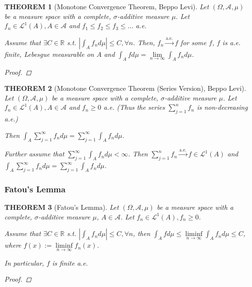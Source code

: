 \documentclass[12pt]{article}
\theoremstyle{blueplain}
\newtheorem{theorem}{THEOREM}[section]
\theoremstyle{bluedef}
\theoremstyle{blueremark}
\newcommand{\R}{\mathbb{R}}
\numberwithin{equation}{section}
\begin{document}
\begin{theorem}[Monotone Convergence Theorem, Beppo Levi]

  Let $(\Omega, \mathcal{A}, \mu)$ be a measure space with a complete, $\sigma$-additive measure $\mu$. Let $f_n \in \mathcal{L}^1(A), A \in \mathcal{A}$ and $f_1 \leq f_2 \leq f_3 \leq \ldots$ a.e.

  Assume that $\exists C \in \R$ s.t. $|\int_A f_n d\mu| \leq C, \forall n$. Then, $f_n \overset{\text{a.e.}}{\rightarrow} f$ for some $f$, $f$ is a.e. finite, Lebesgue measurable on $A$ and $\int_A f d\mu = \lim\limits_{n \to \infty} \int_A f_n d\mu$.

  \begin{proof}




  \end{proof}
\end{theorem}

\begin{theorem}[Monotone Convergence Theorem (Series Version), Beppo Levi]

  Let $(\Omega, \mathcal{A}, \mu)$ be a measure space with a complete, $\sigma$-additive measure $\mu$. Let $f_n \in \mathcal{L}^1(A), A \in \mathcal{A}$ and $f_n \geq 0$ a.e. (Thus  the series $\sum_{j=1}^n f_n$ is non-decreasing a.e.)

  Then $\int_A \sum_{j=1}^\infty f_n d\mu = \sum_{j=1}^\infty \int_A f_n d\mu$.

  Further assume that $\sum_{j=1}^\infty \int_A f_n d\mu < \infty$. Then $\sum_{j=1}^n f_n \overset{\text{a.e.}}{\rightarrow} f \in \mathcal{L}^1(A)$ and $\int_A \sum_{j=1}^\infty f_n d\mu = \sum_{j=1}^\infty \int_A f_n d\mu$.
\end{theorem}

\subsubsection{Fatou's Lemma}

\begin{theorem}[Fatou's Lemma]

  Let $(\Omega, \mathcal{A}, \mu)$ be a measure space with a complete, $\sigma$-additive measure $\mu$, $A \in \mathcal{A}$. Let $f_n \in \mathcal{L}^1(A), f_n \geq 0$.

  Assume that $\exists C \in \R$ s.t. $|\int_A f_n d\mu| \leq C, \forall n$, then $\int_A f d\mu \leq \liminf\limits_{n \to \infty} \int_A f_n d\mu \leq C$, where $f(x) := \liminf\limits_{n \to \infty} f_n(x)$.

  In particular, $f$ is finite a.e.

  \begin{proof}



  \end{proof}
\end{theorem}
\end{document}
